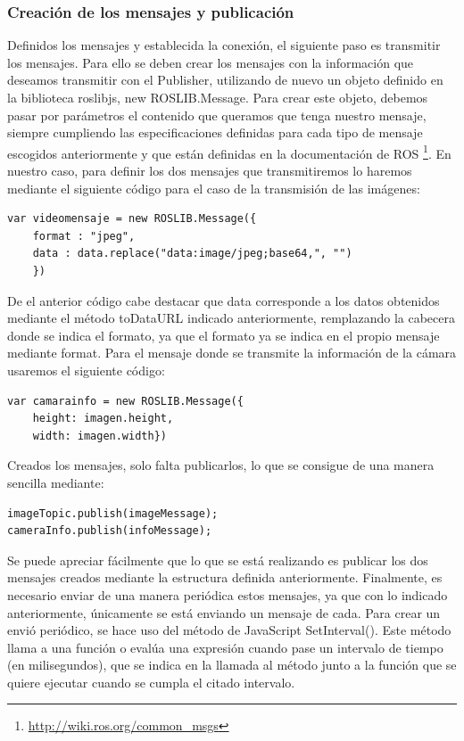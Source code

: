 \subsubsection{Creación de los mensajes y publicación}
Definidos los mensajes y establecida la conexión, el siguiente paso es transmitir los mensajes. Para ello se deben crear los mensajes con la información que deseamos transmitir con el Publisher, utilizando de nuevo un objeto definido en la biblioteca roslibjs, new ROSLIB.Message. Para crear este objeto, debemos pasar por parámetros el contenido que queramos que tenga nuestro mensaje, siempre cumpliendo las especificaciones definidas para cada tipo de mensaje escogidos anteriormente y que están definidas en la documentación de ROS  \footnote{\url{http://wiki.ros.org/common_msgs}}. En nuestro caso, para definir los dos mensajes que transmitiremos lo haremos mediante el siguiente código para el caso de la transmisión de las imágenes:
\begin{lstlisting}[frame=single]
 var videomensaje = new ROSLIB.Message({
 	format : "jpeg", 
	data : data.replace("data:image/jpeg;base64,", "")
	})

\end{lstlisting}
De el anterior código cabe destacar que data corresponde a los datos obtenidos mediante el método toDataURL indicado anteriormente, remplazando la cabecera donde se indica el formato, ya que el formato ya se indica en el propio mensaje mediante format.  Para el mensaje donde se transmite la información de la cámara usaremos el siguiente código:

\begin{lstlisting}[frame=single]
var camarainfo = new ROSLIB.Message({
	height: imagen.height,
	width: imagen.width})

\end{lstlisting}
Creados los mensajes, solo falta publicarlos, lo que se consigue de una manera sencilla mediante:
\begin{lstlisting}[frame=single]
imageTopic.publish(imageMessage);
cameraInfo.publish(infoMessage);
\end{lstlisting}
Se puede apreciar fácilmente que lo que se está realizando es publicar los dos mensajes creados mediante la estructura definida anteriormente. 
Finalmente, es necesario enviar de una manera periódica estos mensajes, ya que con lo indicado anteriormente, únicamente se está enviando un mensaje de cada. Para crear un envió periódico, se hace uso del método de JavaScript SetInterval(). Este método llama a una función o evalúa una expresión cuando pase un intervalo de tiempo (en milisegundos), que se indica en la llamada al método junto a la función que se quiere ejecutar cuando se cumpla el citado intervalo.

